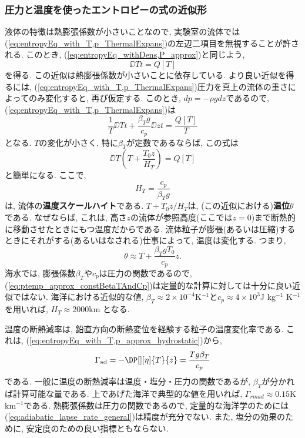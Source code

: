 \subsubsection*{圧力と温度を使ったエントロピーの式の近似形}
液体の特徴は熱膨張係数が小さいことなので, 
実験室の流体では(\ref{eq:entropyEq_with_T,p_ThermalExpans})の左辺二項目を無視することが許される. 
このとき, (\ref{eq:entropyEq_withDens,P_approx})と同じよう, 
\begin{equation}
 \DD{T}{t} = Q[T]
\end{equation} 
を得る. 
この近似は熱膨張係数が小さいことに依存している. 
より良い近似を得るには, (\ref{eq:entropyEq_with_T,p_ThermalExpans})圧力を真上の流体の重さによってのみ変化すると, 
再び仮定する. 
このとき, $dp = -\rho gdz$であるので, (\ref{eq:entropyEq_with_T,p_ThermalExpans})は
\begin{equation}
 \dfrac{1}{T}\DD{T}{t} + \dfrac{\beta_T g}{c_p} \DD{z}{t} = \dfrac{Q[T]}{T}
 \label{eq:entropyEq_with_T,p_approx_hydrostatic}
\end{equation}
となる. 
$T$の変化が小さく, 特に$\beta_T$が定数であるならば, 
この式は
\begin{equation}
 \DD{}{T} \left( T + \dfrac{T_0 z}{H_T} \right) = Q[T]
\end{equation}
と簡単になる. 
ここで, 
\begin{equation}
 H_T = \dfrac{c_p}{\beta_T g}
 \label{eq:temp_scale_height}
\end{equation}
は, 流体の\textbf{温度スケールハイト}である. 
$T+T_0z/H_T$は, (この近似における)\textbf{温位}$\theta$である. 
なぜならば, これは, 高さ$z$の流体が参照高度(ここでは$z=0$)まで断熱的に移動させたときにもつ温度だからである. 
流体粒子が膨張(あるいは圧縮)するときにそれがする(あるいはなされる)仕事によって, 温度は変化する. 
つまり, 
\begin{equation}
 \theta \approx T + \dfrac{\beta_T g T_0}{c_p} z. 
 \label{eq:ptemp_approx_constBetaTAndCp}
\end{equation}
海水では, 膨張係数$\beta_T$や$c_p$は圧力の関数であるので, 
(\ref{eq:ptemp_approx_constBetaTAndCp})は定量的な計算に対しては十分に良い近似ではない. 
海洋における近似的な値, $\beta_T \approx 2\times 10^{-4}$K$^{-1}$と$c_p \approx 4 \times 10^3$J kg$^{-1}$ K$^{-1}$を用いれば, 
$H_T \approx 2000$km となる. 

温度の断熱減率は, 鉛直方向の断熱変位を経験する粒子の温度変化率である. 
これは, (\ref{eq:entropyEq_with_T,p_approx_hydrostatic})から, 
\begin{equation}
 \Gamma_{\rm ad} = -\DP[][\eta]{T}{z} = \dfrac{T g \beta_T}{c_p}
\label{eq:adiabatic_lapse_rate_general}
\end{equation}
である. 
一般に温度の断熱減率は温度・塩分・圧力の関数であるが, 
$\beta_T$が分かれば計算可能な量である. 
上であげた海洋で典型的な値を用いれば, $\Gamma_{rm ad} \approx 0.15$K km$^{-1}$である. 
熱膨張係数は圧力の関数であるので, 定量的な海洋学のためには(\ref{eq:adiabatic_lapse_rate_general})は精度が充分でない. 
また, 塩分の効果のために, 安定度のための良い指標ともならない. 

